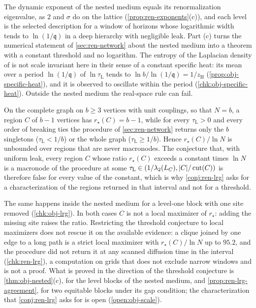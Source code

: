 The dynamic exponent of the nested medium equals its renormalization eigenvalue, as $2$ and $\sigma$ do on the lattice (\cref{prop:ren-exponents}(c)), and each level is the selected description for a window of horizons whose logarithmic width tends to $\ln(1/\mathfrak q)$ in a deep hierarchy with negligible leak. Part (c) turns the numerical statement of \cref{sec:ren-network} about the nested medium into a theorem with a constant threshold and no logarithm. The entropy of the Laplacian density of \citet{villegas2023laplacian} is not scale invariant here in their sense of a constant specific heat: its mean over a period $\ln(1/\mathfrak q)$ of $\ln\tau_{\mathrm L}$ tends to $\ln b/\ln(1/\mathfrak q)=1/z_{\mathrm H}$ (\cref{prop:obj-specific-heat}), and it is observed to oscillate within the period (\cref{chk:obj-specific-heat}). Outside the nested medium the real-space rule can fail.

\begin{proposition}\label{prop:obj-lrg-counter}
On the complete graph on $b\ge3$ vertices with unit couplings, so that $N=b$, a region $C$ of $b-1$ vertices has $r_\star(C)=b-1$, while for every $\tau_{\mathrm L}>0$ and every order of breaking ties the procedure of \cref{sec:ren-network} returns only the $b$ singletons ($\tau_{\mathrm L}<1/b$) or the whole graph ($\tau_{\mathrm L}\ge1/b$). Hence $r_\star(C)/\ln N$ is unbounded over regions that are never macronodes. The conjecture that, with uniform leak, every region $C$ whose ratio $r_\star(C)$ exceeds a constant times $\ln N$ is a macronode of the procedure at some $\tau_{\mathrm L}\in(1/\lambda_2(L_C),\lvert C\rvert/\operatorname{cut}(C))$ is therefore false for every value of the constant, which is why \cref{conj:ren-lrg} asks for a characterization of the regions returned in that interval and not for a threshold.
\end{proposition}

The same happens inside the nested medium for a level-one block with one site removed (\cref{chk:obj-lrg}). In both cases $C$ is not a local maximizer of $r_\star$: adding the missing site raises the ratio. Restricting the threshold conjecture to local maximizers does not rescue it on the available evidence: a clique joined by one edge to a long path is a strict local maximizer with $r_\star(C)/\ln N$ up to $95.2$, and the procedure did not return it at any scanned diffusion time in the interval (\cref{chk:ren-lrg}), a computation on grids that does not exclude narrow windows and is not a proof. What is proved in the direction of the threshold conjecture is \cref{thm:obj-nested}(c), for the level blocks of the nested medium, and \cref{prop:ren-lrg-agreement}, for two equitable blocks under its gap condition; the characterization that \cref{conj:ren-lrg} asks for is open (\cref{open:obj-scale}).

